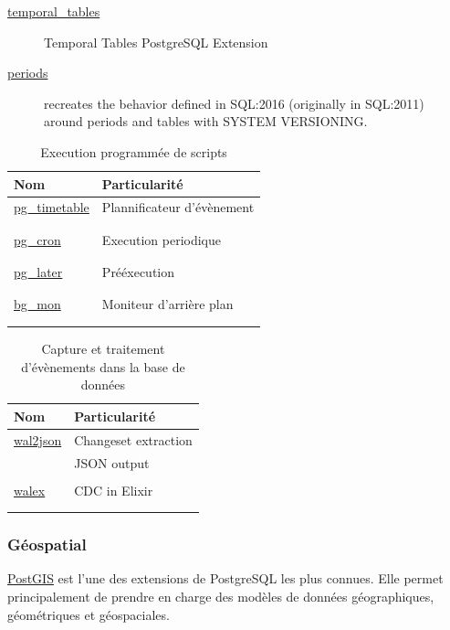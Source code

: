 \documentclass[a4paper,12pt]{article}
\begin{document}
\begin{multicols*}{2}
\begin{description}
\item[{\href{https://github.com/arkhipov/temporal\_tables}{temporal\_tables}}] Temporal Tables PostgreSQL Extension
\item[{\href{https://github.com/xocolatl/periods}{periods}}] recreates the behavior defined in SQL:2016 (originally in SQL:2011) around periods and tables with SYSTEM VERSIONING.
\end{description}

\begin{table}[H]
\caption{Execution programmée de scripts}
\centering
\begin{tabular}{ll}
Nom & Particularité\\
\hline
\href{https://github.com/cybertec-postgresql/pg\_timetable}{pg\_timetable} & Plannificateur d'évènement\\
 & \\
 & \\
\href{https://github.com/citusdata/pg\_cron}{pg\_cron} & Execution periodique\\
 & \\
 & \\
\href{https://github.com/tembo-io/pg\_later}{pg\_later} & Prééxecution\\
 & \\
 & \\
\href{https://github.com/CyberDem0n/bg\_mon}{bg\_mon} & Moniteur d'arrière plan\\
 & \\
 & \\
\end{tabular}
\end{table}

\begin{table}[H]
\caption{Capture et traitement d'évènements dans la base de données}
\centering
\begin{tabular}{ll}
Nom & Particularité\\
\hline
\href{https://github.com/eulerto/wal2json}{wal2json} & Changeset extraction\\
 & JSON output\\
 & \\
\href{https://github.com/cpursley/walex}{walex} & CDC in Elixir\\
 & \\
 & \\
\end{tabular}
\end{table}
\subsubsection*{Géospatial}
\label{sec:org5117d28}
\href{https://github.com/postgis/postgis}{PostGIS} est l'une des extensions de PostgreSQL les plus connues. Elle permet principalement de prendre en charge des modèles de données géographiques, géométriques et géospaciales.


\end{multicols*}
\end{document}
